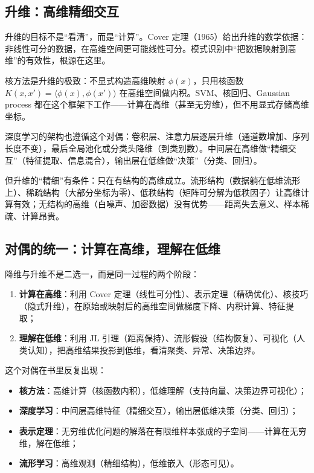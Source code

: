 \subsection{升维：高维精细交互}

升维的目标不是``看清''，而是``计算''。Cover 定理（1965）给出升维的数学依据：非线性可分的数据，在高维空间更可能线性可分。模式识别中``把数据映射到高维''的有效性，根源在这里。

核方法是升维的极致：不显式构造高维映射 $\phi(x)$，只用核函数 $K(x,x')=\langle\phi(x),\phi(x')\rangle$ 在高维空间做内积。SVM、核回归、Gaussian process 都在这个框架下工作——计算在高维（甚至无穷维），但不用显式存储高维坐标。

深度学习的架构也遵循这个对偶：卷积层、注意力层逐层升维（通道数增加、序列长度不变），最后全局池化或分类头降维（到类别数）。中间层在高维做``精细交互''（特征提取、信息混合），输出层在低维做``决策''（分类、回归）。

但升维的``精细''有条件：只在有结构的高维成立。流形结构（数据躺在低维流形上）、稀疏结构（大部分坐标为零）、低秩结构（矩阵可分解为低秩因子）让高维计算有效；无结构的高维（白噪声、加密数据）没有优势——距离失去意义、样本稀疏、计算昂贵。

\subsection{对偶的统一：计算在高维，理解在低维}

降维与升维不是二选一，而是同一过程的两个阶段：

\begin{enumerate}
\def\labelenumi{\arabic{enumi}.}
\tightlist
\item
  \textbf{计算在高维}：利用 Cover 定理（线性可分性）、表示定理（精确优化）、核技巧（隐式升维），在原始或映射后的高维空间做梯度下降、内积计算、特征提取；
\item
  \textbf{理解在低维}：利用 JL 引理（距离保持）、流形假设（结构恢复）、可视化（人类认知），把高维结果投影到低维，看清聚类、异常、决策边界。
\end{enumerate}

这个对偶在书里反复出现：

\begin{itemize}
\tightlist
\item
  \textbf{核方法}：高维计算（核函数内积），低维理解（支持向量、决策边界可视化）；
\item
  \textbf{深度学习}：中间层高维特征（精细交互），输出层低维决策（分类、回归）；
\item
  \textbf{表示定理}：无穷维优化问题的解落在有限维样本张成的子空间——计算在无穷维，解在低维；
\item
  \textbf{流形学习}：高维观测（精细结构），低维嵌入（形态可见）。
\end{itemize}

